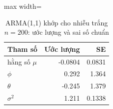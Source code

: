 \begin{table}[H]
\centering\small
\caption{ARMA(1,1) khớp cho nhiễu trắng $n=200$: ước lượng và sai số chuẩn}\label{tab:tab_b11_10_overparameterized}
\begin{adjustbox}{max width=\linewidth}
\begin{tabular}{lrr}
\toprule
Tham số & Ước lượng & SE \\
\midrule
hằng số $\mu$ & -0.0804 & 0.0831 \\
$\phi$ & 0.292 & 1.364 \\
$\theta$ & -0.245 & 1.379 \\
$\sigma^{2}$ & 1.211 & 0.1338 \\
\bottomrule
\end{tabular}
\end{adjustbox}
\end{table}
